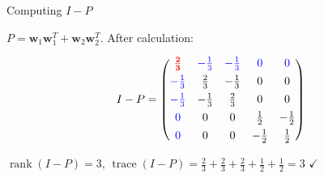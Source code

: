 \documentclass[10pt]{beamer}
\theoremstyle{definition}
\newcommand{\pvt}[1]{{\color{red}\mathbf{#1}}}       %
\newcommand{\crs}[1]{{\color{blue}#1}}                %
\begin{document}
\begin{frame}{Computing $I - P$}

$P = \mathbf{w}_1\mathbf{w}_1^T + \mathbf{w}_2\mathbf{w}_2^T$. After calculation:

$$I - P = \begin{pmatrix}
\pvt{\tfrac{2}{3}} & \crs{{-}\tfrac{1}{3}} & \crs{{-}\tfrac{1}{3}} & \crs{0} & \crs{0} \\[4pt]
\crs{{-}\tfrac{1}{3}} & \tfrac{2}{3} & {-}\tfrac{1}{3} & 0 & 0 \\[4pt]
\crs{{-}\tfrac{1}{3}} & {-}\tfrac{1}{3} & \tfrac{2}{3} & 0 & 0 \\[4pt]
\crs{0} & 0 & 0 & \tfrac{1}{2} & {-}\tfrac{1}{2} \\[4pt]
\crs{0} & 0 & 0 & {-}\tfrac{1}{2} & \tfrac{1}{2}
\end{pmatrix}$$

\vspace{0.3em}

$\operatorname{rank}(I - P) = 3$, \quad $\operatorname{trace}(I - P) = \tfrac{2}{3} + \tfrac{2}{3} + \tfrac{2}{3} + \tfrac{1}{2} + \tfrac{1}{2} = 3$ $\checkmark$

\end{frame}
\end{document}
